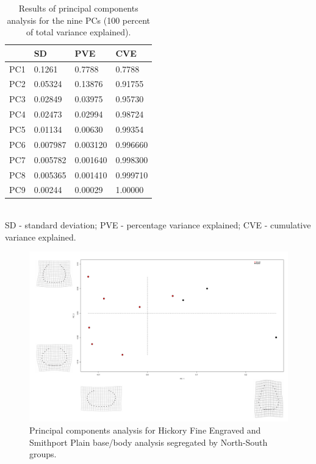 \documentclass[review]{elsarticle}
\begin{document}
\begin{table}[htbp]\centering
\footnotesize
\caption{Results of principal components analysis for the nine PCs (100 percent of total variance explained).}
\centering
\begin{tabular}{lp{2cm}p{2cm}p{2cm}}
\toprule
 & SD & PVE & CVE\\
\midrule
PC1 & 0.1261 & 0.7788 & 0.7788\\
PC2 & 0.05324 & 0.13876 & 0.91755\\
PC3 & 0.02849 & 0.03975 & 0.95730\\
PC4 & 0.02473 & 0.02994 & 0.98724\\
PC5 & 0.01134 & 0.00630 & 0.99354\\
PC6 & 0.007987 & 0.003120 & 0.996660\\
PC7 & 0.005782 & 0.001640 & 0.998300\\
PC8 & 0.005365 & 0.001410 & 0.999710\\
PC9 & 0.00244 & 0.00029 & 1.00000\\
\bottomrule
\end{tabular}
\smallskip\\
SD - standard deviation; PVE - percentage variance explained; CVE - cumulative variance explained.
\label{tab:Tbl2}
\end{table}

\begin{figure}[htbp]\centering
\includegraphics[width=\linewidth]{pcabba}
\caption{Principal components analysis for Hickory Fine Engraved and Smithport Plain base/body analysis segregated by North-South groups.}
\label{fig:FigPCAbba}
\end{figure}
\end{document}
